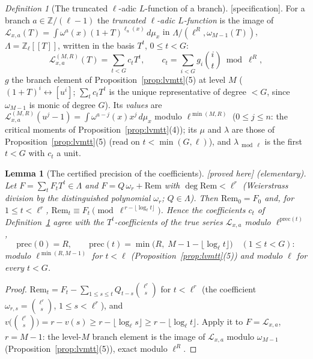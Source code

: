 \documentclass[11pt]{article}
\newtheorem{lemma}[theorem]{Lemma}
\theoremstyle{remark}
\newtheorem{definition}[theorem]{Definition}
\newcommand{\Z}{\mathbb{Z}}
\newcommand{\PROVED}{\textsf{[proved here]}}
\newcommand{\SPEC}{\textsf{[specification]}}           %
\begin{document}
\begin{definition}[The truncated $\ell$-adic $L$-function of a branch]\label{def:lvlfun}
\SPEC. For a branch $a\in\Z/(\ell-1)$ the \emph{truncated $\ell$-adic $L$-function} is the image of $\mathcal L_{x,a}(T)=\int\omega^{a}(x)(1+T)^{\ell_u(x)}\,d\mu_x$ in
$\Lambda/(\ell^{R},\omega_{M-1}(T))$, $\Lambda=\Z_\ell[\![T]\!]$, written in the basis $T^{t}$, $0\le t<G$:
\[
  \mathcal L^{(M,R)}_{x,a}(T)=\sum_{t<G}c_tT^{t},\qquad c_t=\sum_{i<G}g_i\binom it\bmod\ell^{R},
\]
$g$ the branch element of Proposition~\ref{prop:lvmtt}(5) at level $M$ ($(1+T)^{i}\leftrightarrow[u^{i}]$; $\sum_tc_tT^{t}$ is the unique representative of degree $<G$, since $\omega_{M-1}$ is
monic of degree $G$). Its \emph{values} are $\mathcal L^{(M,R)}_{x,a}(u^{j}-1)=\int\omega^{a-j}(x)x^{j}\,d\mu_x$ modulo $\ell^{\min(M,R)}$ ($0\le j\le n$: the critical moments of
Proposition~\ref{prop:lvmtt}(4)); its $\mu$ and $\lambda$ are those of Proposition~\ref{prop:lvmtt}(5) (read on $t<\min(G,\ell)$), and $\lambda_{\bmod\ell}$ is the first $t<G$ with $c_t$ a unit.
\end{definition}

\begin{lemma}[The certified precision of the coefficients]\label{lem:lvlfunprec}
\PROVED{} (elementary). Let $F=\sum_tF_tT^{t}\in\Lambda$ and $F=Q\,\omega_r+\mathrm{Rem}$ with $\deg\mathrm{Rem}<\ell^{r}$ (Weierstrass division by the distinguished polynomial $\omega_r$; $Q\in\Lambda$).
Then $\mathrm{Rem}_0=F_0$ and, for $1\le t<\ell^{r}$, $\mathrm{Rem}_t\equiv F_t\pmod{\ell^{\,r-\lfloor\log_\ell t\rfloor}}$. Hence the coefficients $c_t$ of Definition~\ref{def:lvlfun} agree with the
$T^{t}$-coefficients of the true series $\mathcal L_{x,a}$ modulo $\ell^{\mathrm{prec}(t)}$,
\[
  \mathrm{prec}(0)=R,\qquad \mathrm{prec}(t)=\min\bigl(R,\;M-1-\lfloor\log_\ell t\rfloor\bigr)\quad(1\le t<G):
\]
modulo $\ell^{\min(R,M-1)}$ for $t<\ell$ (Proposition~\ref{prop:lvmtt}(5)) and modulo $\ell$ for every $t<G$.
\end{lemma}

\begin{proof}
$\mathrm{Rem}_t=F_t-\sum_{1\le s\le t}Q_{t-s}\binom{\ell^{r}}{s}$ for $t<\ell^{r}$ (the coefficient $\omega_{r,s}=\binom{\ell^{r}}s$, $1\le s<\ell^{r}$), and
$v\bigl(\binom{\ell^{r}}s\bigr)=r-v(s)\ge r-\lfloor\log_\ell s\rfloor\ge r-\lfloor\log_\ell t\rfloor$. Apply it to $F=\mathcal L_{x,a}$, $r=M-1$: the level-$M$ branch element is the image of $\mathcal L_{x,a}$
modulo $\omega_{M-1}$ (Proposition~\ref{prop:lvmtt}(5)), exact modulo $\ell^{R}$.
\end{proof}
\end{document}

